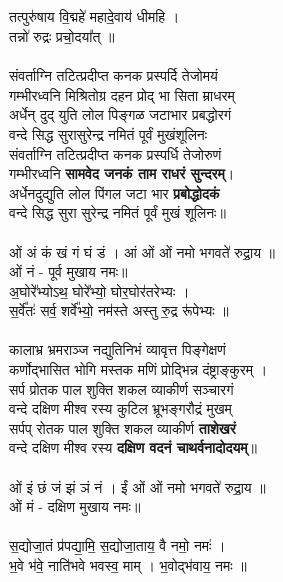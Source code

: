 \subsection{}
तत्पुरु॑षाय वि॒द्महे॑ महादे॒वाय॑ धीमहि । \\
तन्नो॑ रुद्रः प्रचो॒दया᳚त् ॥\\
\\
संवर्ताग्नि तटित्प्रदीप्त कनक प्रस्पर्दि तेजोमयं\\
गम्भीरध्वनि  मिश्रितोग्र दहन प्रोद् भा सिता म्राधरम्\\
अर्धेन् दुद् युति लोल पिङ्गळ जटाभार प्रबद्धोरगं\\
वन्दे सिद्ध सुरासुरेन्द्र नमितं पूर्वं मुखंशूलिनः \\
{\small
संवर्ताग्नि तटित्प्रदीप्त कनक प्रस्पर्धि तेजोरुणं\\
गम्भीरध्वनि \textbf{सामवेद जनकं ताम राधरं सुन्दरम्}।\\
अर्धेनदुद्युति लोल पिंगल जटा भार \textbf{प्रबोद्धोदकं} \\
वन्दे सिद्ध सुरा सुरेन्द्र नमितं पूर्वं मुखं शूलिनः॥\\
}
\\
ओं अं कं खं गं घं डं । आं ओं ओं नमो भगवते॑ रुद्रा॒य ॥\\
ओं नं - पूर्व मुखाय नमः॥\\
अ॒घोरे᳚भ्योऽथ॒ घोरे᳚भ्यो॒ घोर॒घोर॑तरेभ्यः । \\
स॒र्वे᳚तः॑ सर्व॒ शर्वे᳚भ्यो॒ नम॑स्ते अस्तु रु॒द्र रू॑पेभ्यः ॥\\
\\
कालाभ्र भ्रमराञ्ज नद्युतिनिभं व्यावृत्त पिङ्गेक्षणं\\
कर्णोद्भासित भोगि मस्तक मणिं प्रोद्भिन्न दंष्ट्राङ्कुरम् ।\\
सर्प प्रोतक पाल शुक्ति शकल व्याकीर्ण सञ्चारगं\\
वन्दे दक्षिण मीश्व रस्य कुटिल भ्रूभङ्गरौद्रं मुखम् \\
{\small
सर्पप् रोतक पाल शुक्ति शकल व्याकीर्ण \textbf{ताशेखरं}\\
वन्दे दक्षिण मीश्व रस्य \textbf{दक्षिण वदनं चाथर्वनादोदयम्}॥\\ 
}
\\
ओं इं छं जं झं ञं नं । ईं ओं ओं नमो भगवते॑ रुद्रा॒य ॥\\
ओं मं  - दक्षिण मुखाय नमः॥\\
\\
स॒द्योजा॒तं प्र॑पद्या॒मि॒ स॒द्योजा॒ताय॒ वै नमो॒ नमः॑ ।\\
भ॒वे भ॑वे॒ नाति॑भवे भवस्व॒ माम् । भ॒वोद्भ॑वाय॒ नमः ॥\\
